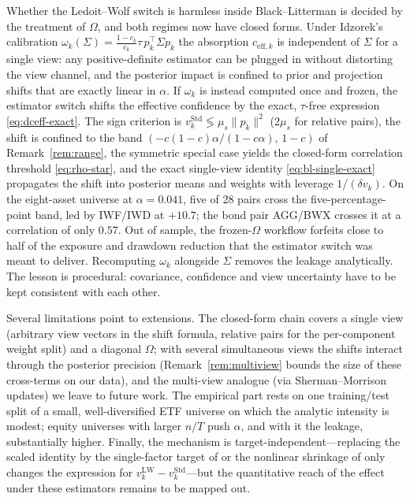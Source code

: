 \documentclass[a4paper,11pt]{article}
\theoremstyle{plain}
\theoremstyle{definition}
\newcommand{\Std}{\mathrm{Std}}
\newcommand{\LW}{\mathrm{LW}}
\newcommand{\eff}{\mathrm{eff}}
\begin{document}
Whether the Ledoit--Wolf switch is harmless inside Black--Litterman is
decided by the treatment of $\Omega$, and both regimes now have closed
forms. Under Idzorek's calibration
$\omega_k(\Sigma) = \tfrac{1-c_k}{c_k}\tau\,p_k^\top\Sigma p_k$ the
absorption $c_{\eff,k}$ is independent of $\Sigma$ for a single view:
any positive-definite estimator can be plugged in without distorting the
view channel, and the posterior impact is confined to prior and
projection shifts that are exactly linear in $\alpha$. If
$\omega_k$ is instead computed once and frozen, the estimator switch
shifts the effective confidence by the exact, $\tau$-free expression
\eqref{eq:dceff-exact}. The sign criterion is
$v_k^\Std \lessgtr \mu_s\lVert p_k\rVert^2$ ($2\mu_s$ for relative
pairs), the shift is confined to the band
$(-c(1-c)\alpha/(1-c\alpha),\,1-c)$ of Remark~\ref{rem:range}, the
symmetric special case yields the closed-form correlation threshold
\eqref{eq:rho-star}, and the exact
single-view identity \eqref{eq:bl-single-exact} propagates the shift
into posterior means and weights with leverage $1/(\delta v_k)$. On the
eight-asset universe at $\alpha = 0.041$, five of 28 pairs cross the
five-percentage-point band, led by IWF/IWD at $+10.7$; the bond pair
AGG/BWX crosses it at a correlation of only $0.57$. Out of sample, the
frozen-$\Omega$ workflow forfeits close to half of the exposure and
drawdown reduction that the estimator switch was meant to deliver.
Recomputing $\omega_k$ alongside $\Sigma$ removes the leakage
analytically. The lesson is procedural: covariance, confidence and view
uncertainty have to be kept consistent with each other.

Several limitations point to extensions. The closed-form chain covers a
single view (arbitrary view vectors in the shift formula, relative
pairs for the per-component weight split) and a diagonal $\Omega$; with
several simultaneous
views the shifts interact through the posterior precision
(Remark~\ref{rem:multiview} bounds the size of these cross-terms on our
data), and the multi-view analogue (via Sherman--Morrison updates) we
leave to future work. The empirical part
rests on one training/test split of a small, well-diversified ETF
universe on which the analytic intensity is modest; equity universes
with larger $n/T$ push $\alpha$, and with it the leakage, substantially
higher. Finally, the mechanism is target-independent---replacing the
scaled identity by the single-factor target of \citet{LedoitWolf2003} or
the nonlinear shrinkage of \citet{LedoitWolf2017} only changes the
expression for $v_k^{\LW} - v_k^\Std$---but the quantitative reach of
the effect under these estimators remains to be mapped out.
\end{document}
